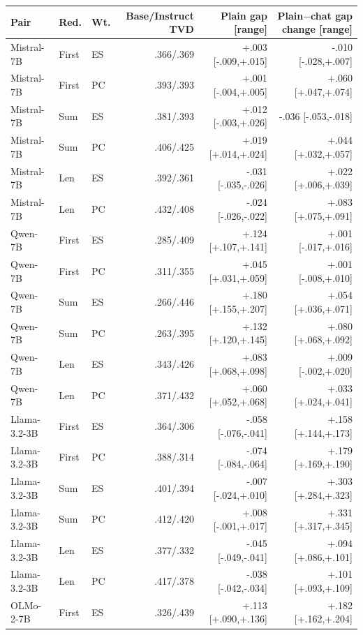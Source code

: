\begin{table}[t]
\centering\scriptsize
\begin{tabular}{lllrrr}
\toprule
Pair & Red. & Wt. & Base/Instruct TVD & Plain gap [range] & Plain$-$chat gap change [range] \\
\midrule
Mistral-7B & First & ES & .366/.369 & +.003 [-.009,+.015] & -.010 [-.028,+.007] \\
Mistral-7B & First & PC & .393/.393 & +.001 [-.004,+.005] & +.060 [+.047,+.074] \\
Mistral-7B & Sum & ES & .381/.393 & +.012 [-.003,+.026] & -.036 [-.053,-.018] \\
Mistral-7B & Sum & PC & .406/.425 & +.019 [+.014,+.024] & +.044 [+.032,+.057] \\
Mistral-7B & Len & ES & .392/.361 & -.031 [-.035,-.026] & +.022 [+.006,+.039] \\
Mistral-7B & Len & PC & .432/.408 & -.024 [-.026,-.022] & +.083 [+.075,+.091] \\
Qwen-7B & First & ES & .285/.409 & +.124 [+.107,+.141] & +.001 [-.017,+.016] \\
Qwen-7B & First & PC & .311/.355 & +.045 [+.031,+.059] & +.001 [-.008,+.010] \\
Qwen-7B & Sum & ES & .266/.446 & +.180 [+.155,+.207] & +.054 [+.036,+.071] \\
Qwen-7B & Sum & PC & .263/.395 & +.132 [+.120,+.145] & +.080 [+.068,+.092] \\
Qwen-7B & Len & ES & .343/.426 & +.083 [+.068,+.098] & +.009 [-.002,+.020] \\
Qwen-7B & Len & PC & .371/.432 & +.060 [+.052,+.068] & +.033 [+.024,+.041] \\
Llama-3.2-3B & First & ES & .364/.306 & -.058 [-.076,-.041] & +.158 [+.144,+.173] \\
Llama-3.2-3B & First & PC & .388/.314 & -.074 [-.084,-.064] & +.179 [+.169,+.190] \\
Llama-3.2-3B & Sum & ES & .401/.394 & -.007 [-.024,+.010] & +.303 [+.284,+.323] \\
Llama-3.2-3B & Sum & PC & .412/.420 & +.008 [-.001,+.017] & +.331 [+.317,+.345] \\
Llama-3.2-3B & Len & ES & .377/.332 & -.045 [-.049,-.041] & +.094 [+.086,+.101] \\
Llama-3.2-3B & Len & PC & .417/.378 & -.038 [-.042,-.034] & +.101 [+.093,+.109] \\
OLMo-2-7B & First & ES & .326/.439 & +.113 [+.090,+.136] & +.182 [+.162,+.204] \\

\end{tabular}
\end{table}
